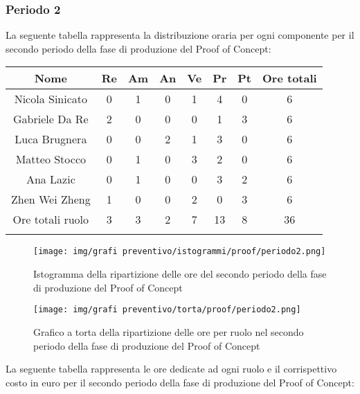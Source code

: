 \newpage
\subsubsection{Periodo 2}
%
La seguente tabella rappresenta la distribuzione oraria per ogni componente per il secondo periodo della fase di produzione del Proof of Concept:

	\setlength\extrarowheight{5pt}
	\begin{tabularx}{\textwidth}{|ccccccc|c|}
		\hline
		\rowcolor{white}
		\textbf{Nome} & \textbf{Re} & \textbf{Am} & \textbf{An} & \textbf{Ve} & \textbf{Pr}& \textbf{Pt} & \textbf{Ore totali} \\
		\hline
		Nicola Sinicato &0&1&0&1&4&0&6 \\
		Gabriele Da Re &2&0&0&0&1&3&6 \\
		Luca Brugnera &0&0&2&1&3&0&6 \\
		Matteo Stocco &0&1&0&3&2&0&6 \\
		Ana Lazic &0&1&0&0&3&2&6 \\
		Zhen Wei Zheng &1&0&0&2&0&3&6 \\
		\hline
		Ore totali ruolo &3&3&2&7&13&8&36 \\
		\hline
		\rowcolor{white}
		\caption{Distribuzione oraria durante il secondo periodo di produzione del Proof of Concept per ruolo e persona}
	\end{tabularx}
	\vspace{10pt}
	
\begin{figure}[H]
    \centering
    \texttt{[image: img/grafi preventivo/istogrammi/proof/periodo2.png]}
    \caption{Istogramma della ripartizione delle ore del secondo periodo della fase di produzione del Proof of Concept}
\end{figure}
\begin{figure}[H]
    \centering
    \texttt{[image: img/grafi preventivo/torta/proof/periodo2.png]}
    \caption{Grafico a torta della ripartizione delle ore per ruolo nel secondo periodo della fase di produzione del Proof of Concept}
\end{figure}
La seguente tabella rappresenta le ore dedicate ad ogni ruolo e il corrispettivo costo in euro per il secondo periodo della fase di produzione del Proof of Concept:

